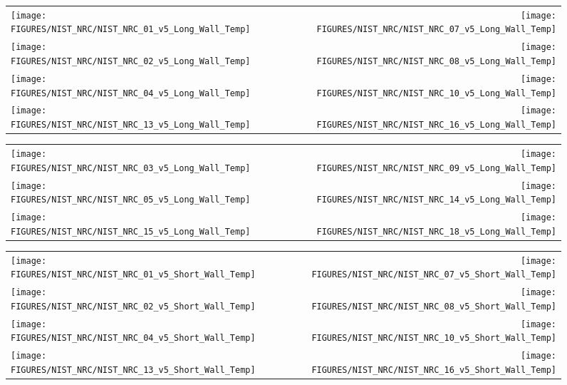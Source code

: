 \begin{figure}[p]
\begin{tabular*}{\textwidth}{l@{\extracolsep{\fill}}r}
\texttt{[image: FIGURES/NIST\_NRC/NIST\_NRC\_01\_v5\_Long\_Wall\_Temp]} &
\texttt{[image: FIGURES/NIST\_NRC/NIST\_NRC\_07\_v5\_Long\_Wall\_Temp]} \\
\texttt{[image: FIGURES/NIST\_NRC/NIST\_NRC\_02\_v5\_Long\_Wall\_Temp]} &
\texttt{[image: FIGURES/NIST\_NRC/NIST\_NRC\_08\_v5\_Long\_Wall\_Temp]} \\
\texttt{[image: FIGURES/NIST\_NRC/NIST\_NRC\_04\_v5\_Long\_Wall\_Temp]} &
\texttt{[image: FIGURES/NIST\_NRC/NIST\_NRC\_10\_v5\_Long\_Wall\_Temp]} \\
\texttt{[image: FIGURES/NIST\_NRC/NIST\_NRC\_13\_v5\_Long\_Wall\_Temp]} &
\texttt{[image: FIGURES/NIST\_NRC/NIST\_NRC\_16\_v5\_Long\_Wall\_Temp]}
\end{tabular*}
\label{NIST_NRC_Long_Wall_Temp_Closed}
\end{figure}

\begin{figure}[p]
\begin{tabular*}{\textwidth}{l@{\extracolsep{\fill}}r}
\texttt{[image: FIGURES/NIST\_NRC/NIST\_NRC\_03\_v5\_Long\_Wall\_Temp]} &
\texttt{[image: FIGURES/NIST\_NRC/NIST\_NRC\_09\_v5\_Long\_Wall\_Temp]} \\
\texttt{[image: FIGURES/NIST\_NRC/NIST\_NRC\_05\_v5\_Long\_Wall\_Temp]} &
\texttt{[image: FIGURES/NIST\_NRC/NIST\_NRC\_14\_v5\_Long\_Wall\_Temp]} \\
\texttt{[image: FIGURES/NIST\_NRC/NIST\_NRC\_15\_v5\_Long\_Wall\_Temp]} &
\texttt{[image: FIGURES/NIST\_NRC/NIST\_NRC\_18\_v5\_Long\_Wall\_Temp]}
\end{tabular*}
\label{NIST_NRC_Long_Wall_Temp_Open}
\end{figure}

\begin{figure}[p]
\begin{tabular*}{\textwidth}{l@{\extracolsep{\fill}}r}
\texttt{[image: FIGURES/NIST\_NRC/NIST\_NRC\_01\_v5\_Short\_Wall\_Temp]} &
\texttt{[image: FIGURES/NIST\_NRC/NIST\_NRC\_07\_v5\_Short\_Wall\_Temp]} \\
\texttt{[image: FIGURES/NIST\_NRC/NIST\_NRC\_02\_v5\_Short\_Wall\_Temp]} &
\texttt{[image: FIGURES/NIST\_NRC/NIST\_NRC\_08\_v5\_Short\_Wall\_Temp]} \\
\texttt{[image: FIGURES/NIST\_NRC/NIST\_NRC\_04\_v5\_Short\_Wall\_Temp]} &
\texttt{[image: FIGURES/NIST\_NRC/NIST\_NRC\_10\_v5\_Short\_Wall\_Temp]} \\
\texttt{[image: FIGURES/NIST\_NRC/NIST\_NRC\_13\_v5\_Short\_Wall\_Temp]} &
\texttt{[image: FIGURES/NIST\_NRC/NIST\_NRC\_16\_v5\_Short\_Wall\_Temp]}
\end{tabular*}
\label{NIST_NRC_Short_Wall_Temp_Closed}
\end{figure}

